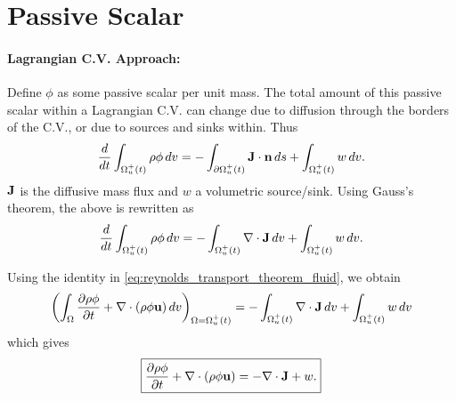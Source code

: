 \documentclass[oneside,a4paper,11pt]{report}
\begin{document}
\section{Passive Scalar}

\paragraph{Lagrangian C.V. Approach:}
Define $\phi$ as some passive scalar per unit mass. The total amount of this passive scalar within a Lagrangian C.V. can change due to diffusion through the borders of the C.V., or due to sources and sinks within. Thus
\begin{equation}
\frac{d}{dt}\int_{\Omega^+_u(t)} \rho \phi \,dv = -\int_{\partial \Omega^+_u(t)} \mathbf{J} \cdot \mathbf{n} \, ds + \int_{\Omega^+_u(t)} w \, dv.
\end{equation}
$\mathbf{J}$ is the diffusive mass flux and $w$ a volumetric source/sink. Using Gauss's theorem, the above is rewritten as 
\begin{equation}
\frac{d}{dt}\int_{\Omega^+_u(t)} \rho \phi \,dv = -\int_{\Omega^+_u(t)} \nabla \cdot \mathbf{J} \, dv + \int_{\Omega^+_u(t)} w \, dv.
\end{equation}

Using the identity in \cref{eq:reynolds_transport_theorem_fluid}, we obtain
\begin{equation}
\left(\int_\Omega \frac{\partial\rho \phi}{\partial t} + \nabla \cdot (\rho \phi \mathbf{u}) \, dv \right)_{\Omega = \Omega^+_u(t)}= -\int_{\Omega^+_u(t)} \nabla \cdot \mathbf{J} \, dv  + \int_{\Omega^+_u(t)} w \, dv
\end{equation}
which gives
\begin{equation}
\boxed{\frac{\partial\rho \phi}{\partial t}+\nabla \cdot (\rho \phi \mathbf{u}) = -\nabla \cdot \mathbf{J} + w.}
\end{equation}
\end{document}
